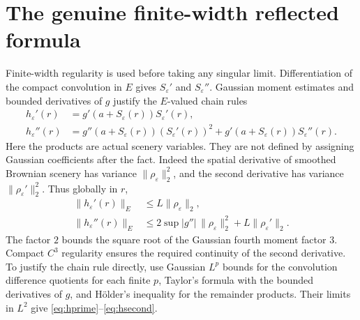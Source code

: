 \documentclass[11pt]{article}
\begin{document}
\section{The genuine finite-width reflected formula}
Finite-width regularity is used before taking any singular limit.
Differentiation of the compact convolution in $E$ gives $S_\varepsilon'$
and $S_\varepsilon''$. Gaussian moment estimates and bounded derivatives
of $g$ justify the $E$-valued chain rules
\begin{align}
 h_\varepsilon'(r)&=g'(a+S_\varepsilon(r))S_\varepsilon'(r),\label{eq:hprime}\\
 h_\varepsilon''(r)&=g''(a+S_\varepsilon(r))(S_\varepsilon'(r))^2
                  +g'(a+S_\varepsilon(r))S_\varepsilon''(r).\label{eq:hsecond}
\end{align}
Here the products are actual scenery variables. They are not defined
by assigning Gaussian coefficients after the fact. Indeed the
spatial derivative of smoothed Brownian scenery has variance
$\|\rho_\varepsilon\|_2^2$, and the second derivative has variance
$\|\rho_\varepsilon'\|_2^2$. Thus globally in $r$,
\begin{align*}
 \|h_\varepsilon'(r)\|_E
     &\leq L\|\rho_\varepsilon\|_2,\\
 \|h_\varepsilon''(r)\|_E
     &\leq 2\sup|g''|\,\|\rho_\varepsilon\|_2^2
                +L\|\rho_\varepsilon'\|_2.
\end{align*}
The factor $2$ bounds the square root of the Gaussian fourth moment
factor $3$. Compact $C^3$ regularity ensures the required continuity
of the second derivative. To justify the chain rule directly, use
Gaussian $L^p$ bounds for the convolution difference quotients for
each finite $p$, Taylor's formula with the bounded derivatives of
$g$, and H\"older's inequality for the remainder products. Their
limits in $L^2$ give \eqref{eq:hprime}--\eqref{eq:hsecond}.
\end{document}
